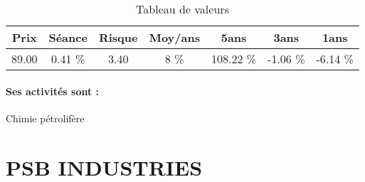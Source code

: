 \documentclass[11pt,a4paper]{report}%
\begin{document}
\begin{table}[H]
  \centering
    \begin{tabular}{|c|c|c|c|c|c|c|}
    \hline
    Prix & Séance & Risque  & Moy/ans & 5ans & 3ans & 1ans \\
    \hline
    89.00 &    0.41 \%    & 3.40 & 8 \% & 108.22 \% & -1.06 \% & -6.14 \% \\
    \hline
    \end{tabular}%
        \label{tab:table_ARKEMA}%
      \caption{Tableau de valeurs}
\end{table}%

\paragraph{Ses activités sont : } Chimie pétrolifère 
    
    \newpage

\section{PSB INDUSTRIES}
\end{document}
